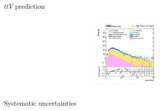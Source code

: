 \documentclass[8pt]{beamer}
\begin{document}
\begin{frame}{$ttV$ prediction}
\begin{columns}
		\begin{column}{0.33\textwidth}
			\begin{center}
     			\includegraphics[width=1.0\textwidth, height=90pt]{figs/2018/log_cratio_ttVCR_ll_METcorrected_pt.png}
    		\end{center}		
		\end{column}
\end{columns} \vfill
\end{frame}


















\begin{frame}[standout]
Systematic uncertainties
\end{frame}
\end{document}
